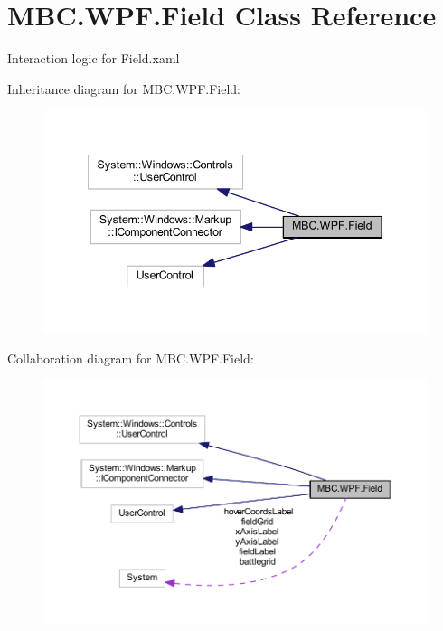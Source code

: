 \hypertarget{class_m_b_c_1_1_w_p_f_1_1_field}{\section{M\-B\-C.\-W\-P\-F.\-Field Class Reference}
\label{class_m_b_c_1_1_w_p_f_1_1_field}
}


Interaction logic for Field.\-xaml  




Inheritance diagram for M\-B\-C.\-W\-P\-F.\-Field\-:
\nopagebreak
\begin{figure}[H]
\begin{center}
\leavevmode
\includegraphics[width=342pt]{class_m_b_c_1_1_w_p_f_1_1_field__inherit__graph}
\end{center}
\end{figure}


Collaboration diagram for M\-B\-C.\-W\-P\-F.\-Field\-:
\nopagebreak
\begin{figure}[H]
\begin{center}
\leavevmode
\includegraphics[width=350pt]{class_m_b_c_1_1_w_p_f_1_1_field__coll__graph}
\end{center}
\end{figure}
